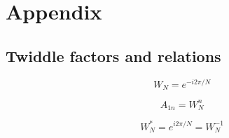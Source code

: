 
\chapter*{Appendix}\label{ch:appendix}

\section*{Twiddle factors and relations}\label{sec:twiddle-factors-and-relations}

\begin{equation}\label{eq:twiddle-factor-appendix}
    W_N = e^{- i 2 \pi / N}
\end{equation}

\begin{equation}\label{eq:twiddle-factor-appendix-2}
    A_{1 n} = W^n_N
\end{equation}

\begin{equation}\label{eq:twiddle-factor-appendix-3}
    W^*_N = e^{i 2 \pi / N} = W^{-1}_N
\end{equation}







